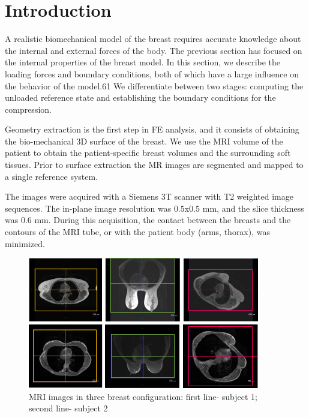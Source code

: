 \section{Introduction}\label{setion:introductionMyBioMecaModel}

A realistic biomechanical model of the breast requires
accurate knowledge about the internal and external forces of
the body. The previous section has focused on the internal
properties of the breast model. In this section, we describe
the loading forces and boundary conditions, both of which
have a large influence on the behavior of the model.61 We differentiate
between two stages: computing the unloaded reference
state and establishing the boundary conditions for the
compression.

\label{section:geometryextraction}

Geometry extraction is the first step in FE analysis, and it
consists of obtaining the bio-mechanical 3D surface of the
breast. We use the MRI volume of the patient to obtain the patient-specific breast volumes and the surrounding soft tissues. Prior to surface extraction the MR images are segmented and mapped to a single reference system.


 The images were acquired with a Siemens 3T scanner with T2 weighted image sequences. The in-plane image resolution was $0.5$x$0.5$ mm, and the slice thickness was 0.6 mm. During this acquisition, the contact between the breasts and the contours of the MRI tube, or with the patient body (arms, thorax), was minimized.
\begin{figure}[H]
\centering
\includegraphics[width=0.9\textwidth,keepaspectratio]{figures/patientData.png} 
\caption{MRI images in three breast configuration: first line- subject 1; second line- subject 2}\label{fig:patientdata}
\end{figure}

